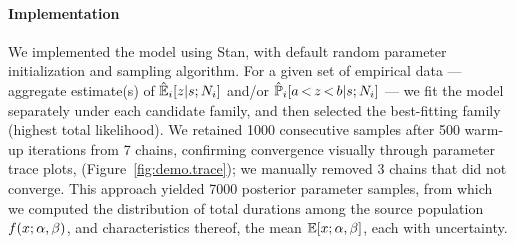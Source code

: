 \paragraph{Implementation}
We implemented the model using Stan,\cite{Stan2024}
with default random parameter initialization and sampling algorithm.\cite{Betancourt2018}
For a given set of empirical data
--- \ie aggregate estimate(s) of $\hat{\mathbb{E}}_i[z|s;N_i]$ and/or $\hat{\mathbb{P}}_i[a\,{<}\,z\,{<}\,b|s;N_i]$ ---
we fit the model separately under each candidate family,
and then selected the best-fitting family (highest total likelihood).
We retained 1000 consecutive samples after 500 warm-up iterations from 7 chains,
confirming convergence visually through parameter trace plots,
(\eg Figure~\ref{fig:demo.trace});
we manually removed 3 chains that did not converge.
This approach yielded 7000 posterior parameter samples, from which we computed
the distribution of total durations among the source population $f(x;\alpha,\beta)$,
and characteristics thereof, \eg the mean $\mathbb{E}[x;\alpha,\beta]$,
each with uncertainty.
\pagebreak %
